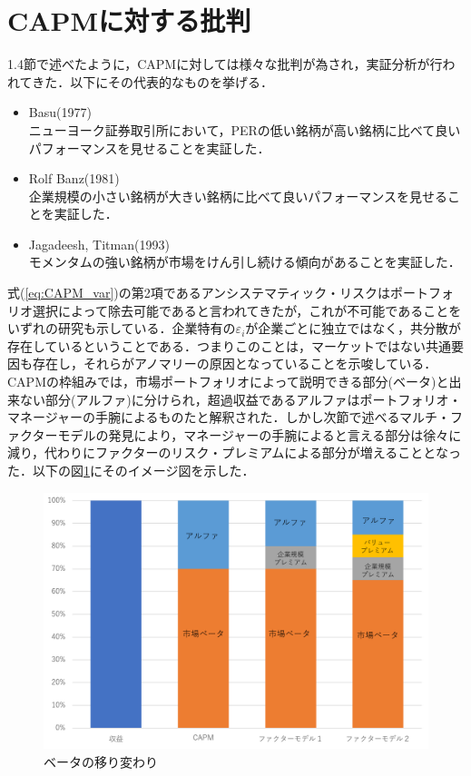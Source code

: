 \documentclass[11pt]{jreport}
\begin{document}
\section{CAPMに対する批判}
1.4節で述べたように，CAPMに対しては様々な批判が為され，実証分析が行われてきた．以下にその代表的なものを挙げる．
\begin{itemize}
\item Basu(1977)\\
ニューヨーク証券取引所において，PERの低い銘柄が高い銘柄に比べて良いパフォーマンスを見せることを実証した．
\item Rolf Banz(1981)\\
企業規模の小さい銘柄が大きい銘柄に比べて良いパフォーマンスを見せることを実証した．
\item Jagadeesh, Titman(1993)\\
モメンタムの強い銘柄が市場をけん引し続ける傾向があることを実証した．
\end{itemize}

式(\ref{eq:CAPM_var})の第2項であるアンシステマティック・リスクはポートフォリオ選択によって除去可能であると言われてきたが，これが不可能であることをいずれの研究も示している．企業特有の$\varepsilon_i$が企業ごとに独立ではなく，共分散が存在しているということである．つまりこのことは，マーケットではない共通要因も存在し，それらがアノマリーの原因となっていることを示唆している．CAPMの枠組みでは，市場ポートフォリオによって説明できる部分(ベータ)と出来ない部分(アルファ)に分けられ，超過収益であるアルファはポートフォリオ・マネージャーの手腕によるものたと解釈された．しかし次節で述べるマルチ・ファクターモデルの発見により，マネージャーの手腕によると言える部分は徐々に減り，代わりにファクターのリスク・プレミアムによる部分が増えることとなった．以下の図\ref{fig:beta}にそのイメージ図を示した．

\begin{figure}[H]
	\begin{center}
		\includegraphics[width=14cm]{./fig/beta}
		\caption{ベータの移り変わり}
		\label{fig:beta}
	\end{center}
\end{figure}
\end{document}
